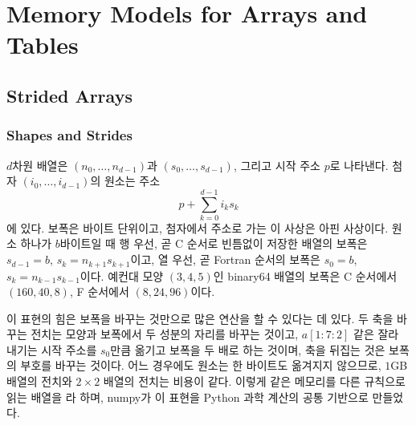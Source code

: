 \chapter{Memory Models for Arrays and Tables}
\label{ch:memory-model}


\section{Strided Arrays}
\label{sec:strides}

\subsection{Shapes and Strides}

$d$차원 배열은  $(n_0,\dots,n_{d-1})$과  $(s_0,\dots,s_{d-1})$, 그리고 시작 주소 $p$로 나타낸다. 첨자 $(i_0,\dots,i_{d-1})$의 원소는 주소
\[
p+\sum_{k=0}^{d-1}i_ks_k
\]
에 있다. 보폭은 바이트 단위이고, 첨자에서 주소로 가는 이 사상은 아핀 사상이다. 원소 하나가 $b$바이트일 때 행 우선, 곧 C 순서로 빈틈없이 저장한 배열의 보폭은 $s_{d-1}=b$, $s_k=n_{k+1}s_{k+1}$이고, 열 우선, 곧 Fortran 순서의 보폭은 $s_0=b$, $s_k=n_{k-1}s_{k-1}$이다. 예컨대 모양 $(3,4,5)$인 binary64 배열의 보폭은 C 순서에서 $(160,40,8)$, F 순서에서 $(8,24,96)$이다.

이 표현의 힘은 보폭을 바꾸는 것만으로 많은 연산을 할 수 있다는 데 있다. 두 축을 바꾸는 전치는 모양과 보폭에서 두 성분의 자리를 바꾸는 것이고, $a[1{:}7{:}2]$ 같은 잘라 내기는 시작 주소를 $s_0$만큼 옮기고 보폭을 두 배로 하는 것이며, 축을 뒤집는 것은 보폭의 부호를 바꾸는 것이다. 어느 경우에도 원소는 한 바이트도 옮겨지지 않으므로, $1$GB 배열의 전치와 $2\times2$ 배열의 전치는 비용이 같다. 이렇게 같은 메모리를 다른 규칙으로 읽는 배열을 라 하며, numpy가 이 표현을 Python 과학 계산의 공통 기반으로 만들었다\cite{vanderwalt2011numpy,harris2020numpy}.

